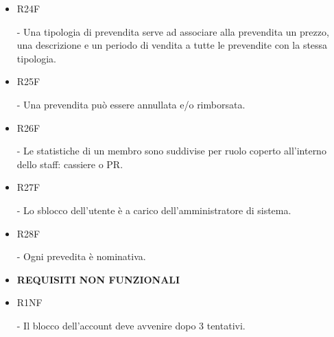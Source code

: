 \documentclass[a4paper]{article}
\begin{document}
\begin{itemize}
	\item \hypertarget{R24F}{R24F} - Una tipologia di prevendita serve ad associare alla prevendita un prezzo, una descrizione e un periodo di vendita a tutte le prevendite con la stessa tipologia.

	\item \hypertarget{R25F}{R25F} - Una prevendita può essere annullata e/o rimborsata. 
	
	\item \hypertarget{R26F}{R26F} - Le statistiche di un membro sono suddivise per ruolo coperto all'interno dello staff: cassiere o PR.
	
	\item \hypertarget{R27F}{R27F} - Lo sblocco dell'utente è a carico dell'amministratore di sistema.
	
	\item \hypertarget{R28F}{R28F} - Ogni prevedita è nominativa.
	
		
    \item \textbf{REQUISITI NON FUNZIONALI}
	
	\item \hypertarget{R1NF}{R1NF} - Il blocco dell'account deve avvenire dopo 3 tentativi.
	

\end{itemize}
\end{document}

